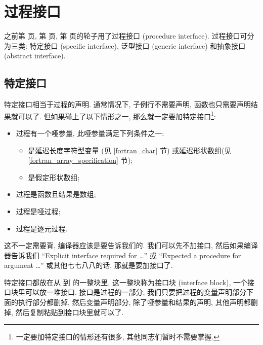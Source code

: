 \section{过程接口} \label{fortran_interface} 

之前第 \pageref{assumed-shape_array_program} 页, 第 \pageref{dummy_procedure_program} 页, 第 \pageref{elemental_procedure_program} 页的轮子用了过程接口 (procedure interface). 过程接口可分为三类: 特定接口 (specific interface), 泛型接口 (generic interface) 和抽象接口 (abstract interface). 

\subsection{特定接口} 

特定接口相当于过程的声明. 通常情况下, 子例行不需要声明, 函数也只需要声明结果就可以了. 但如果碰上了以下情形之一, 那么就一定要加特定接口\footnote{一定要加特定接口的情形还有很多, 其他同志们暂时不需要掌握.}:\label{whether_specific_interface}
\begin{itemize} 
    \item 过程有一个哑参量, 此哑参量满足下列条件之一: \begin{itemize} 
        \item 是延迟长度字符型变量 (见 \ref{fortran_char} 节) 或延迟形状数组(见\ref{fortran_array_specification} 节);
        \item 是假定形状数组;
    \end{itemize} 
    \item 过程是函数且结果是数组;
    \item 过程是哑过程;
    \item 过程是逐元过程.
\end{itemize} 
这不一定需要背, 编译器应该是要告诉我们的. 我们可以先不加接口, 然后如果编译器告诉我们 ``Explicit interface required for \dots{}'' 或 ``Expected a procedure for argument \dots{}'' 或其他七七八八的话, 那就是要加接口了. 

特定接口都放在从  到  的一整块里, 这一整块称为接口块 (interface block), 一个接口块里可以放一堆接口. 接口是过程的一部分, 我们只要把过程的变量声明部分下面的执行部分都删掉, 然后变量声明部分, 除了哑参量和结果的声明, 其他声明都删掉, 然后复制粘贴到接口块里就可以了. 

